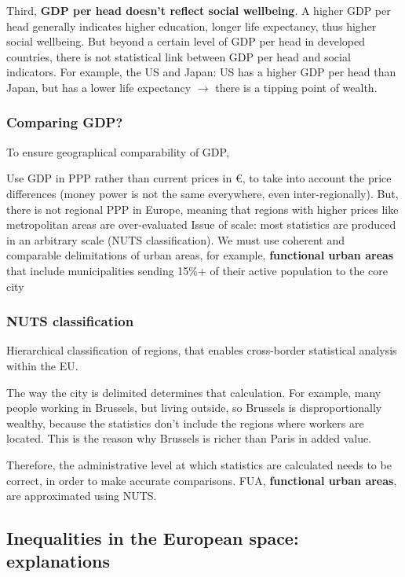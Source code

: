 \documentclass{article}
\begin{document}
Third, \textbf{GDP per head doesn't reflect social wellbeing}. A higher GDP per head generally indicates higher education, longer life expectancy, thus higher social wellbeing. But beyond a certain level of GDP per head in developed countries, there is not statistical link between GDP per head and social indicators. 
For example, the US and Japan: US has a higher GDP per head than Japan, but has a lower life expectancy $\rightarrow$ there is a tipping point of wealth.

\subsubsection{Comparing GDP?}

To ensure geographical comparability of GDP,

\begin{outline}
	\1 Use GDP in PPP rather than current prices in €, to take into account the price differences (money power is not the same everywhere, even inter-regionally). But, there is not regional PPP in Europe, meaning that regions with higher prices like metropolitan areas are over-evaluated
	\1 Issue of scale: most statistics are produced in an arbitrary scale (NUTS classification). We must use coherent and comparable delimitations of urban areas, for example, \textbf{functional urban areas} that include municipalities sending 15\%+ of their active population to the core city
	
\end{outline}

\subsubsection{NUTS classification}

Hierarchical classification of regions, that enables cross-border statistical analysis within the EU. 

The way the city is delimited determines that calculation. For example, many people working in Brussels, but living outside, so Brussels is disproportionally wealthy, because the statistics don't include the regions where workers are located. This is the reason why Brussels is richer than Paris in added value. 

Therefore, the administrative level at which statistics are calculated needs to be correct, in order to make accurate comparisons. 
FUA, \textbf{functional urban areas}, are approximated using NUTS. 

\subsection{Inequalities in the European space: explanations}
\end{document}
